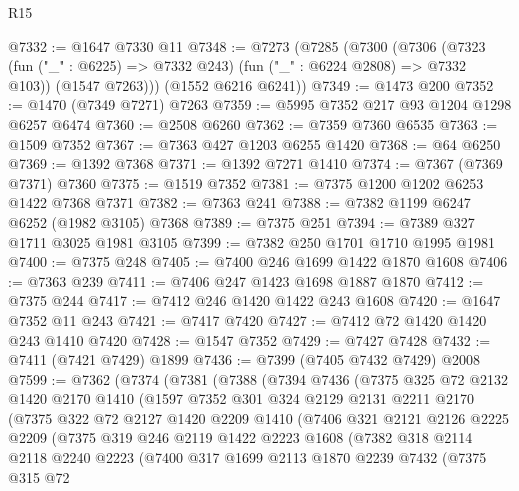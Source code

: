 \begin{lexlean}{R15}
\begin{coremodule}
@7332 := @1647 @7330 @11
@7348 := @7273
    (@7285
      (@7300
        (@7306
          (@7323 (fun ("_" : @6225) => @7332 @243) (fun ("_" : @6224 @2808) => @7332 @103))
          (@1547 @7263)))
      (@1552 @6216 @6241))
@7349 := @1473 @200
@7352 := @1470 (@7349 @7271) @7263
@7359 := @5995 @7352 @217 @93 @1204 @1298 @6257 @6474
@7360 := @2508 @6260
@7362 := @7359 @7360 @6535
@7363 := @1509 @7352
@7367 := @7363 @427 @1203 @6255 @1420
@7368 := @64 @6250
@7369 := @1392 @7368
@7371 := @1392 @7271 @1410
@7374 := @7367 (@7369 @7371) @7360
@7375 := @1519 @7352
@7381 := @7375 @1200 @1202 @6253 @1422 @7368 @7371
@7382 := @7363 @241
@7388 := @7382 @1199 @6247 @6252 (@1982 @3105) @7368
@7389 := @7375 @251
@7394 := @7389 @327 @1711 @3025 @1981 @3105
@7399 := @7382 @250 @1701 @1710 @1995 @1981
@7400 := @7375 @248
@7405 := @7400 @246 @1699 @1422 @1870 @1608
@7406 := @7363 @239
@7411 := @7406 @247 @1423 @1698 @1887 @1870
@7412 := @7375 @244
@7417 := @7412 @246 @1420 @1422 @243 @1608
@7420 := @1647 @7352 @11 @243
@7421 := @7417 @7420
@7427 := @7412 @72 @1420 @1420 @243 @1410 @7420
@7428 := @1547 @7352
@7429 := @7427 @7428
@7432 := @7411 (@7421 @7429) @1899
@7436 := @7399 (@7405 @7432 @7429) @2008
@7599 := @7362
    (@7374
      (@7381
        (@7388
          (@7394
            @7436
            (@7375
              @325
              @72
              @2132
              @1420
              @2170
              @1410
              (@1597
                @7352
                @301
                @324
                @2129
                @2131
                @2211
                @2170
                (@7375
                  @322
                  @72
                  @2127
                  @1420
                  @2209
                  @1410
                  (@7406
                    @321
                    @2121
                    @2126
                    @2225
                    @2209
                    (@7375
                      @319
                      @246
                      @2119
                      @1422
                      @2223
                      @1608
                      (@7382
                        @318
                        @2114
                        @2118
                        @2240
                        @2223
                        (@7400
                          @317
                          @1699
                          @2113
                          @1870
                          @2239
                          @7432
                          (@7375
                            @315
                            @72

\end{coremodule}
\end{lexlean}
